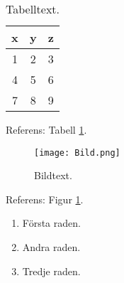 \begin{table}[h!]
	\centering
    \caption{Tabelltext.}
    \begin{tabular}{ c c c } %
        \hline
        x & y & z \\
        \hline
        1 & 2 & 3 \\
        4 & 5 & 6 \\
        7 & 8 & 9 \\
    \end{tabular}
    \label{Tabell1}
\end{table}

\noindent Referens: Tabell \ref{Tabell1}.

\begin{figure}[h!]
	\centering
    \texttt{[image: Bild.png]}
    \caption{Bildtext.}
    \label{Bild1}
\end{figure}

\noindent Referens: Figur \ref{Bild1}.

\begin{enumerate}
    \item Första raden.
    \item Andra raden.
    \item Tredje raden.
\end{enumerate}